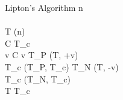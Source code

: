 
\begin{pseudocode}{Lipton's Algorithm}{\phi}
n  \phi \\
\\
T \GETS {}(n) \\
\FOREACH {} C  \phi \DO
	\BEGIN
	T_c \GETS \emptyset \\
	\FOREACH {} v  C \DO
		\BEGIN
			\IF v  \THEN
				\BEGIN
					T_P \GETS {}(T, +v)\\
					T_c \GETS {}(T_P, T_c)						
				\END
			\ELSE
				\BEGIN
					T_N \GETS {}(T, -v)\\
					T_c \GETS {}(T_N, T_c)						
				\END
		\END
	\\
	T \GETS T_c\\
	\END
\\
\end{pseudocode}

